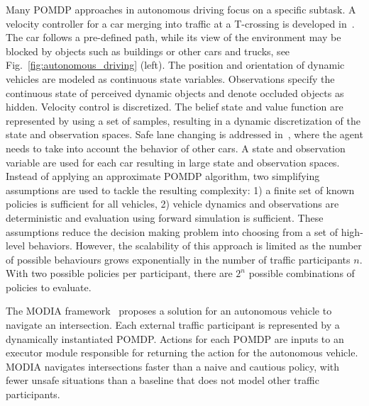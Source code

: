 \documentclass[journal]{IEEEtran}
\begin{document}
Many POMDP approaches in autonomous driving focus on a specific subtask.
{A velocity controller for a car merging into traffic at a T-crossing is developed in~\cite{brechtel2014probabilistic}.}
The car
follows a pre-defined path, while its view of the environment may be blocked by objects such as buildings or other cars and trucks, see Fig.~\ref{fig:autonomous_driving} (left).
%
The
position and orientation of dynamic vehicles are modeled as continuous
state variables. Observations specify the continuous state of perceived
dynamic objects and denote occluded objects as hidden. Velocity control is discretized.
{The belief state and value function are represented by using a set of samples, resulting in a dynamic discretization of the state and observation spaces.
%
}
Safe lane changing is addressed in~\cite{cunningham2015mpdm}, where the agent needs to take into
account the behavior of other cars.
A state and observation
variable are {used} for each car resulting in large state and observation
spaces.
Instead of applying an approximate POMDP algorithm, two simplifying assumptions are used to tackle the resulting complexity: 1) a finite set of
known policies is sufficient for all vehicles, 2) vehicle dynamics and
observations are deterministic and evaluation using forward simulation
is sufficient.
These assumptions reduce the decision making problem into choosing from a set
of high-level behaviors.
{However, the scalability of this approach is limited as the number of possible behaviours grows exponentially in the number of traffic participants $n$.
With two possible policies per participant, there are $2^n$ possible combinations of policies to evaluate.}

{
The MODIA framework~\cite{wray2017,wray2021} proposes a solution for an autonomous vehicle to navigate an intersection.
Each external traffic participant is represented by a dynamically instantiated POMDP.
Actions for each POMDP are inputs to an executor module responsible for returning the action for the autonomous vehicle.
MODIA navigates intersections faster than a naive and cautious policy, with fewer unsafe situations than a baseline that does not model other traffic participants.
}
\end{document}
